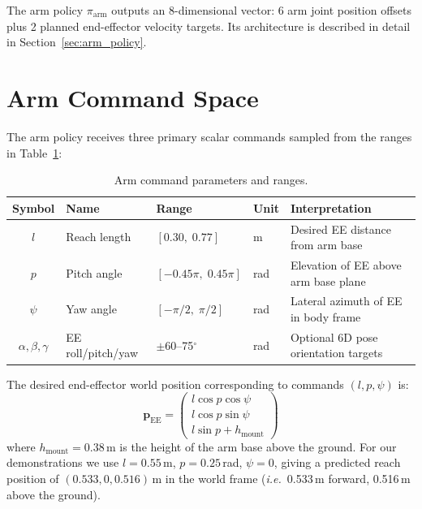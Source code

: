The arm policy $\pi_\text{arm}$ outputs an 8-dimensional vector:
6 arm joint position offsets plus 2 planned end-effector velocity targets.
Its architecture is described in detail in Section~\ref{sec:arm_policy}.

\section{Arm Command Space}
\label{sec:commands}

The arm policy receives three primary scalar commands sampled from the
ranges in Table~\ref{tab:arm_commands}:

\begin{table}[htbp]
  \centering
  \caption{Arm command parameters and ranges.}
  \label{tab:arm_commands}
  \renewcommand{\arraystretch}{1.1}
  \begin{tabular}{cllll}
    \toprule
    \textbf{Symbol} & \textbf{Name} & \textbf{Range} &
    \textbf{Unit} & \textbf{Interpretation} \\
    \midrule
    $l$    & Reach length & $[0.30,\; 0.77]$ & m    &
             Desired EE distance from arm base \\
    $p$    & Pitch angle  & $[-0.45\pi,\; 0.45\pi]$ & rad &
             Elevation of EE above arm base plane \\
    $\psi$ & Yaw angle    & $[-\pi/2,\; \pi/2]$ & rad &
             Lateral azimuth of EE in body frame \\
    $\alpha,\beta,\gamma$ & EE roll/pitch/yaw & $\pm$60--75$^\circ$ & rad &
             Optional 6D pose orientation targets \\
    \bottomrule
  \end{tabular}
\end{table}

The desired end-effector world position corresponding to commands
$(l, p, \psi)$ is:
\begin{equation}
  \mathbf{p}_\text{EE} =
  \begin{pmatrix}
    l\cos p\cos\psi \\
    l\cos p\sin\psi \\
    l\sin p + h_\text{mount}
  \end{pmatrix}
  \label{eq:ee_pos}
\end{equation}
where $h_\text{mount} = 0.38$\,m is the height of the arm base above the
ground.
For our demonstrations we use $l = 0.55$\,m, $p = 0.25$\,rad,
$\psi = 0$, giving a predicted reach position of
$(0.533, 0, 0.516)$\,m in the world frame
(\emph{i.e.}\ 0.533\,m forward, 0.516\,m above the ground).

